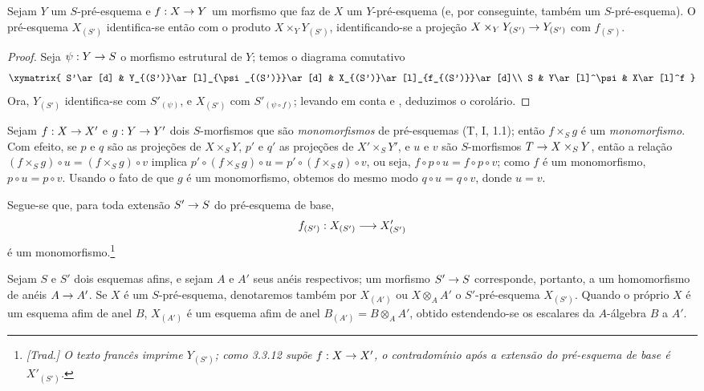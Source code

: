 \documentclass[oneside]{amsart}
\makeatletter
\newcommand{\ega@arrow}[2]{\mathchoice{#1}{#2}{#2}{#2}}
\renewcommand{\to}{\ega@arrow{\longrightarrow}{\rightarrow}}
\newcommand{\oldpage}[2][]{{\marginnote{\normalfont\textbf{#1}~|~#2}}\ignorespaces}
\let\EGAOriginalLabel\label
\renewcommand{\label}[1]{\phantomsection\EGAOriginalLabel{#1}}
\makeatother
\begin{document}
\begin{corollary}[3.3.11]
\label{I.3.3.11}
Sejam $Y$ um $S$-pré-esquema e $f:X\to Y$ um morfismo que faz de $X$ um
$Y$-pré-esquema (e, por conseguinte, também um $S$-pré-esquema). O
pré-esquema $X_{(S')}$ identifica-se então com o produto
$X\times_Y Y_{(S')}$, identificando-se a projeção
$X\times_Y Y_{(S')}\to Y_{(S')}$ com $f_{(S')}$. 
\end{corollary}

\begin{proof}
Seja $\psi:Y\to S$ o morfismo estrutural de $Y$; temos o diagrama comutativo
\[
  \xymatrix{
    S'\ar[d] &
    Y_{(S')}\ar[l]_{\psi_{(S')}}\ar[d] &
    X_{(S')}\ar[l]_{f_{(S')}}\ar[d]\\
    S &
    Y\ar[l]^\psi &
    X\ar[l]^f
  }
\]
Ora, $Y_{(S')}$ identifica-se com $S'_{(\psi)}$, e $X_{(S')}$ com
$S'_{(\psi\circ f)}$; levando em conta  e
, deduzimos o corolário.
\end{proof}

\begin{env}[3.3.12]
\label{I.3.3.12}
Sejam $f:X\to X'$ e $g:Y\to Y'$ dois $S$-morfismos que são
\emph{monomorfismos} de pré-esquemas (T, I, 1.1); então $f\times_S g$ é um
\emph{monomorfismo}. Com efeito, se $p$ e $q$ são as projeções de
$X\times_S Y$, $p'$ e $q'$ as projeções de $X'\times_S Y'$, e $u$ e $v$ são
$S$-morfismos $T\to X\times_S Y$, então a relação
$(f\times_S g)\circ u=(f\times_S g)\circ v$ implica
$p'\circ(f\times_S g)\circ u=p'\circ(f\times_S g)\circ v$, ou seja,
$f\circ p\circ u=f\circ p\circ v$; como $f$ é um monomorfismo,
$p\circ u=p\circ v$. Usando o fato de que $g$ é um monomorfismo, obtemos do
mesmo modo $q\circ u=q\circ v$, donde $u=v$.

\oldpage[I]{111}
Segue-se que, para toda extensão $S'\to S$ do pré-esquema de base,
\[
  f_{(S')}:X_{(S')}\to X'_{(S')}
\]
é um monomorfismo.\footnote{\emph{[Trad.] O texto francês imprime
$Y_{(S')}$; como 3.3.12 supõe $f:X\to X'$, o contradomínio após a extensão do
pré-esquema de base é $X'_{(S')}$.}}
\end{env}

\begin{env}[3.3.13]
\label{I.3.3.13}
Sejam $S$ e $S'$ dois esquemas afins, e sejam $A$ e $A'$ seus anéis
respectivos; um morfismo $S'\to S$ corresponde, portanto, a um homomorfismo
de anéis $A\to A'$. Se $X$ é um $S$-pré-esquema, denotaremos também por
$X_{(A')}$ ou $X\otimes_A A'$ o $S'$-pré-esquema $X_{(S')}$. Quando o próprio
$X$ é um esquema afim de anel $B$, $X_{(A')}$ é um esquema afim de anel
$B_{(A')}=B\otimes_A A'$, obtido estendendo-se os escalares da $A$-álgebra
$B$ a $A'$.
\end{env}
\end{document}
